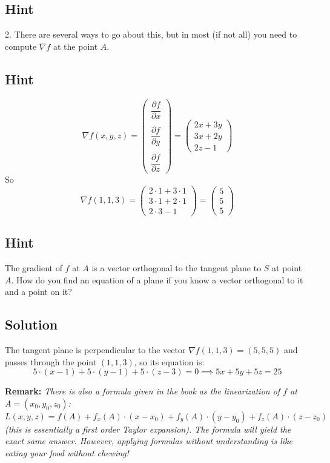 \documentclass[a4paper,10pt]{article}
\begin{document}
\subsection{Hint}
2. There are several ways to go about this, but in most (if not all) you need to compute $\nabla f$ at the point $A$.

\subsection{Hint}
\[
    \nabla f(x,y,z) = \begin{pmatrix}
        \dfrac{\partial f}{\partial x} \\ \\ \dfrac{\partial f}{\partial y} \\ \\ \dfrac{\partial f}{\partial z}
    \end{pmatrix} = \begin{pmatrix}
        2x+3y \\ 3x+2y \\ 2z-1
    \end{pmatrix}
\]
So
\[
    \nabla f(1,1,3) = \begin{pmatrix}
        2\cdot 1+3\cdot 1 \\ 3\cdot 1+2\cdot 1 \\ 2\cdot 3-1
    \end{pmatrix} = \begin{pmatrix}
        5 \\ 5 \\ 5
    \end{pmatrix}
\]

\subsection{Hint}
The gradient of $f$ at $A$ is a vector orthogonal to the tangent plane to $S$ at point $A$. How do you find an equation of a plane if you know a vector orthogonal to it and a point on it?

\subsection{Solution}
The tangent plane is perpendicular to the vector $\nabla f(1, 1, 3) = (5, 5, 5)$ and passes through the point $(1, 1, 3)$, so its equation is:
\[
    5\cdot(x-1) + 5\cdot (y-1) + 5 \cdot (z-3) = 0 \implies 5x+5y+5z = 25
\]

\textbf{Remark:} \emph{There is also a formula given in the book as the linearization of $f$ at $A = (x_0, y_0, z_0)$:
    \[
        L(x,y,z) = f(A) + f_x(A)\cdot (x - x_0) + f_y(A)\cdot (y - y_0) + f_z(A)\cdot (z - z_0)
    \]
    (this is essentially a first order Taylor expansion). The formula will yield the exact same answer. However, applying formulas without understanding is like eating your food without chewing!}
\end{document}
